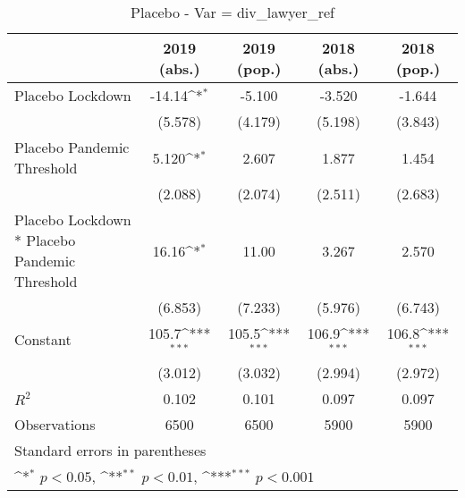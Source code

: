 \documentclass{article}
\begin{document}
{
\def\sym#1{\ifmmode^{#1}\else\(^{#1}\)\fi}
\begin{longtable}{l*{4}{c}}
\caption{Placebo - Var = div\_lawyer\_ref}\\
\hline\hline\endfirsthead\hline\endhead\hline\endfoot\endlastfoot
                &\multicolumn{1}{c}{2019 (abs.)}&\multicolumn{1}{c}{2019 (pop.)}&\multicolumn{1}{c}{2018 (abs.)}&\multicolumn{1}{c}{2018 (pop.)}\\
\hline
Placebo Lockdown&   -14.14\sym{*}  &   -5.100         &   -3.520         &   -1.644         \\
                &  (5.578)         &  (4.179)         &  (5.198)         &  (3.843)         \\
Placebo Pandemic Threshold&    5.120\sym{*}  &    2.607         &    1.877         &    1.454         \\
                &  (2.088)         &  (2.074)         &  (2.511)         &  (2.683)         \\
Placebo Lockdown * Placebo Pandemic Threshold&    16.16\sym{*}  &    11.00         &    3.267         &    2.570         \\
                &  (6.853)         &  (7.233)         &  (5.976)         &  (6.743)         \\
Constant        &    105.7\sym{***}&    105.5\sym{***}&    106.9\sym{***}&    106.8\sym{***}\\
                &  (3.012)         &  (3.032)         &  (2.994)         &  (2.972)         \\
\hline
\(R^{2}\)       &    0.102         &    0.101         &    0.097         &    0.097         \\
Observations    &     6500         &     6500         &     5900         &     5900         \\
\hline\hline
\multicolumn{5}{l}{\footnotesize Standard errors in parentheses}\\
\multicolumn{5}{l}{\footnotesize \sym{*} \(p<0.05\), \sym{**} \(p<0.01\), \sym{***} \(p<0.001\)}\\
\end{longtable}
}
\end{document}
